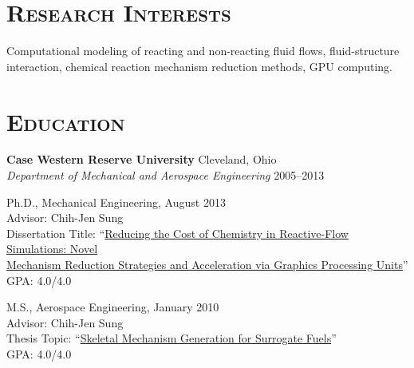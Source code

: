 \documentclass[margin,line,11pt]{res}
\newenvironment{list1}{
  \begin{list}{\ding{113}}{%
      \setlength{\itemsep}{0in}
      \setlength{\parsep}{0in} \setlength{\parskip}{0in}
      \setlength{\topsep}{0in} \setlength{\partopsep}{0in} 
      \setlength{\leftmargin}{0.17in}}}{\end{list}}
\begin{document}

\address{\href{http://mime.oregonstate.edu}{School of Mechanical, Industrial, \& Manufacturing Engineering}, \href{http://oregonstate.edu}{Oregon State University}}
\address{320 Rogers Hall, Corvallis, OR 97331-6001 USA}
\address{+1-541-737-5614 | \href{mailto:Kyle.Niemeyer@oregonstate.edu}{Kyle.Niemeyer@oregonstate.edu}}
\address{\url{http://kyleniemeyer.com}}

\begin{resume}

\section{\textsc{Research Interests}}
Computational modeling of reacting and non-reacting fluid flows, fluid-structure interaction, chemical reaction mechanism reduction methods, GPU computing.


\section{\textsc{Education}}
\textbf{Case Western Reserve University} \hfill Cleveland, Ohio \\
\emph{Department of Mechanical and Aerospace Engineering} \hfill 2005--2013 \\
\begin{list1}

\item[] Ph.D., Mechanical Engineering, August 2013 \\
Advisor:  Chih-Jen Sung \\
Dissertation Title: ``\href{http://kyleniemeyer.com/files/Niemeyer_dissertation.pdf}{Reducing the Cost of Chemistry in Reactive-Flow Simulations: Novel} \\ \href{http://kyleniemeyer.com/files/Niemeyer_dissertation.pdf}{Mechanism Reduction Strategies and Acceleration via Graphics Processing Units}'' \\
GPA: 4.0\slash 4.0 \\

\item[] M.S., Aerospace Engineering,  January 2010 \\
Advisor: Chih-Jen Sung \\
Thesis Topic:  ``\href{http://kyleniemeyer.com/files/Niemeyer_thesis.pdf}{Skeletal Mechanism Generation for Surrogate Fuels}'' \\
GPA: 4.0\slash 4.0 \\


\end{list1}
\end{resume}
\end{document}
